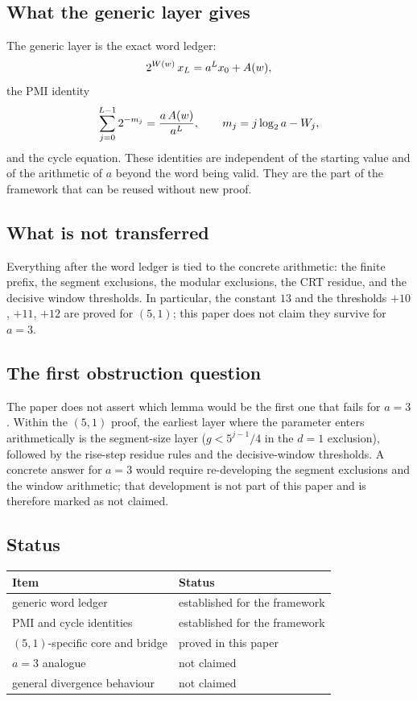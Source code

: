 \subsection{What the generic layer gives}

The generic layer is the exact word ledger:
\begin{equation*}
  2^{W(w)}\,x_L=a^Lx_0+A(w),
\end{equation*}
the PMI identity
\begin{equation*}
  \sum_{j=0}^{L-1}2^{-m_j}
    =\frac{a\,A(w)}{a^L},
  \qquad m_j=j\log_2 a-W_j,
\end{equation*}
and the cycle equation.  These identities are independent of the
starting value and of the arithmetic of $a$ beyond the word being
valid.  They are the part of the framework that can be reused without
new proof.

\subsection{What is not transferred}

Everything after the word ledger is tied to the concrete arithmetic:
the finite prefix, the segment exclusions, the modular exclusions,
the CRT residue, and the decisive window thresholds.  In particular,
the constant $13$ and the thresholds $+10$, $+11$, $+12$ are proved
for $(5,1)$; this paper does not claim they survive for $a=3$.

\subsection{The first obstruction question}

The paper does not assert which lemma would be the first one that
fails for $a=3$.  Within the $(5,1)$ proof, the earliest layer where
the parameter enters arithmetically is the segment-size layer
($g<5^{j-1}/4$ in the $d=1$ exclusion), followed by the rise-step
residue rules and the decisive-window thresholds.  A concrete answer
for $a=3$ would require re-developing the segment exclusions and the
window arithmetic; that development is not part of this paper and is
therefore marked as not claimed.

\subsection{Status}

\begin{center}
\small
\begin{tabular}{@{}p{}p{}@{}}
\toprule
Item & Status \\
\midrule
generic word ledger & established for the framework \\
PMI and cycle identities & established for the framework \\
$(5,1)$-specific core and bridge & proved in this paper \\
$a=3$ analogue & not claimed \\
general divergence behaviour & not claimed \\
\bottomrule
\end{tabular}
\end{center}
